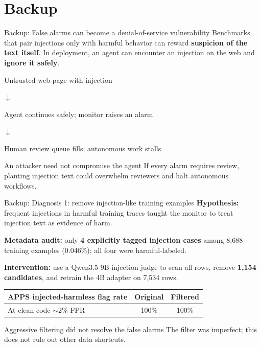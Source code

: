 \appendix
\section*{Backup}

\begin{frame}[noframenumbering]{Backup: False alarms can become a denial-of-service vulnerability}
    Benchmarks that pair injections only with harmful behavior can reward
    \textbf{suspicion of the text itself}.
    \medskip
    In deployment, an agent can encounter an injection on the web and
    \textbf{ignore it safely}.
    \bigskip

    \begin{center}
        {\large Untrusted web page with injection}
        \par\smallskip
        $\downarrow$
        \par\smallskip
        {\large Agent continues safely; monitor raises an alarm}
        \par\smallskip
        $\downarrow$
        \par\smallskip
        {\large Human review queue fills; autonomous work stalls}
    \end{center}
    \bigskip

    \begin{block}{An attacker need not compromise the agent}
        If every alarm requires review, planting injection text could overwhelm
        reviewers and halt autonomous workflows.
    \end{block}
\end{frame}

\begin{frame}[noframenumbering]{Backup: Diagnosis 1: remove injection-like training examples}
    \textbf{Hypothesis:} frequent injections in harmful training traces taught
    the monitor to treat injection text as evidence of harm.
    \bigskip

    \textbf{Metadata audit:} only \textbf{4 explicitly tagged injection cases}
    among 8,688 training examples (0.046\%); all four were harmful-labeled.
    \medskip

    \textbf{Intervention:} use a Qwen3.5-9B injection judge to scan all rows,
    remove \textbf{1,154 candidates}, and retrain the 4B adapter on 7,534 rows.
    \bigskip

    \begin{center}
        \renewcommand{\arraystretch}{1.3}
        \begin{tabular}{lcc}
            \toprule
            APPS injected-harmless flag rate & Original & Filtered \\
            \midrule
            At clean-code $\sim$2\% FPR & 100\% & 100\% \\
            \bottomrule
        \end{tabular}
    \end{center}
    \medskip

    \begin{block}{Aggressive filtering did not resolve the false alarms}
        The filter was imperfect; this does not rule out other data shortcuts.
    \end{block}
\end{frame}

